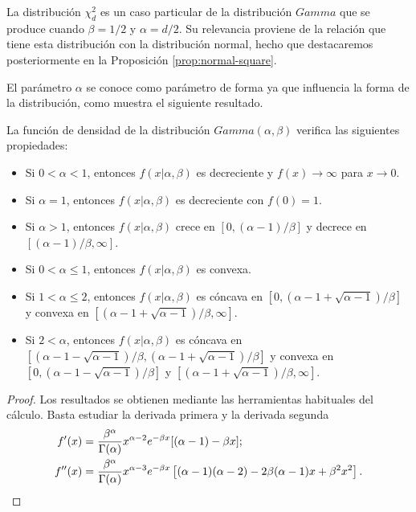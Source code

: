 La distribución $\chi^2_{d}$ es un caso particular de la distribución $Gamma$ que se produce cuando $\beta = 1/2$ y $\alpha = d/2$. Su relevancia proviene de la relación que tiene esta distribución con la distribución normal, hecho que destacaremos posteriormente en la Proposición \ref{prop:normal-square}.

El parámetro $\alpha$ se conoce como parámetro de forma ya que influencia la forma de la distribución, como muestra el siguiente resultado.

\begin{prop}
    La función de densidad de la distribución $Gamma(\alpha, \beta)$ verifica las siguientes propiedades:
    \begin{itemize}
        \item Si $0< \alpha <1$, entonces $f(x | \alpha, \beta)$ es decreciente y $f(x) \to \infty$ para $x \to 0$.
        \item Si $\alpha = 1$, entonces $f(x | \alpha, \beta)$ es decreciente con $f(0) = 1$.
        \item Si $\alpha > 1$, entonces $f(x | \alpha, \beta)$ crece en $[0, (\alpha-1) / \beta]$ y decrece en $[(\alpha-1) / \beta,\infty]$.
        \item Si $0 < \alpha \le 1$, entonces $f(x | \alpha, \beta)$ es convexa.
        \item Si $1 < \alpha \le 2$, entonces $f(x | \alpha, \beta)$ es cóncava en $[0,(\alpha-1 + \sqrt{\alpha - 1}) / \beta]$ y convexa en $[(\alpha-1 + \sqrt{\alpha - 1}) / \beta, \infty]$.
        \item Si $2 < \alpha$, entonces $f(x | \alpha, \beta)$ es cóncava en $[(\alpha-1 - \sqrt{\alpha - 1}) / \beta,(\alpha-1 + \sqrt{\alpha - 1}) / \beta]$ y convexa en $[0, (\alpha-1 - \sqrt{\alpha - 1}) / \beta]$ y $[(\alpha-1 + \sqrt{\alpha - 1}) / \beta, \infty]$.
    \end{itemize}
\end{prop}
\begin{proof}
Los resultados se obtienen mediante las herramientas habituales del cálculo. Basta estudiar la derivada primera y la derivada segunda
\begin{align*}
f^\prime(x) &= \frac{\beta^\alpha}{\Gamma(\alpha)} x^{\alpha-2} e^{-\beta x}[(\alpha - 1) - \beta x]; \\
f^{\prime \prime}(x) &= \frac{\beta^\alpha}{\Gamma(\alpha)} x^{\alpha-3} e^{-\beta x} \left[(\alpha - 1)(\alpha - 2) - 2 \beta (\alpha - 1) x + \beta^2 x^2\right]. \qedhere
\end{align*}
\end{proof}

